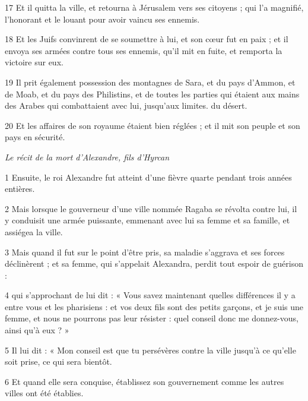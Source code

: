 \par 17 Et il quitta la ville, et retourna à Jérusalem vers ses citoyens ; qui l'a magnifié, l'honorant et le louant pour avoir vaincu ses ennemis.

\par 18 Et les Juifs convinrent de se soumettre à lui, et son cœur fut en paix ; et il envoya ses armées contre tous ses ennemis, qu'il mit en fuite, et remporta la victoire sur eux.

\par 19 Il prit également possession des montagnes de Sara, et du pays d'Ammon, et de Moab, et du pays des Philistins, et de toutes les parties qui étaient aux mains des Arabes qui combattaient avec lui, jusqu'aux limites. du désert.

\par 20 Et les affaires de son royaume étaient bien réglées ; et il mit son peuple et son pays en sécurité.


\par \textit{Le récit de la mort d'Alexandre, fils d'Hyrcan}

\par 1 Ensuite, le roi Alexandre fut atteint d'une fièvre quarte pendant trois années entières.

\par 2 Mais lorsque le gouverneur d'une ville nommée Ragaba se révolta contre lui, il y conduisit une armée puissante, emmenant avec lui sa femme et sa famille, et assiégea la ville.

\par 3 Mais quand il fut sur le point d'être pris, sa maladie s'aggrava et ses forces déclinèrent ; et sa femme, qui s'appelait Alexandra, perdit tout espoir de guérison :

\par 4 qui s'approchant de lui dit : « Vous savez maintenant quelles différences il y a entre vous et les pharisiens : et vos deux fils sont des petits garçons, et je suis une femme, et nous ne pourrons pas leur résister : quel conseil donc me donnez-vous, ainsi qu'à eux ? »

\par 5 Il lui dit : « Mon conseil est que tu persévères contre la ville jusqu'à ce qu'elle soit prise, ce qui sera bientôt.

\par 6 Et quand elle sera conquise, établissez son gouvernement comme les autres villes ont été établies.


